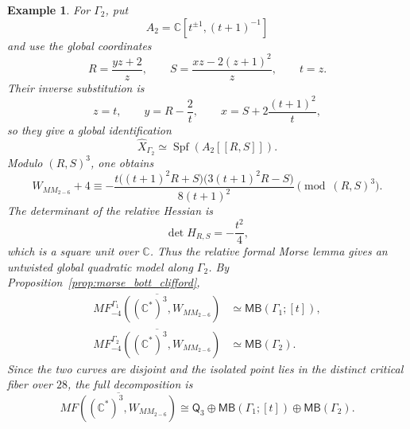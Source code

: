 \documentclass[11pt]{amsart}
\newtheorem{example}{Example}[section]
\newcommand{\MorseCat}[1]{\mathsf{Q}_{#1}}
\newcommand{\MBcat}[1]{\mathsf{MB}(#1)}
\newcommand{\MBtwcat}[2]{\mathsf{MB}(#1;[#2])}
\begin{document}
\begin{example}
For $\Gamma_2$, put
\[
A_2=\mathbb C[t^{\pm1},(t+1)^{-1}]
\]
and use the global coordinates
\[
R=\frac{yz+2}{z},
\qquad
S=\frac{xz-2(z+1)^2}{z},
\qquad
t=z.
\]
Their inverse substitution is
\[
z=t,
\qquad
y=R-\frac{2}{t},
\qquad
x=S+2\frac{(t+1)^2}{t},
\]
so they give a global identification
\[
\widehat X_{\Gamma_2}\simeq\operatorname{Spf}(A_2[[R,S]]).
\]
Modulo $(R,S)^3$, one obtains
\[
W_{MM_{2-6}}+4\equiv
-\frac{t\bigl((t+1)^2R+S\bigr)\bigl(3(t+1)^2R-S\bigr)}{8(t+1)^2}
\pmod{(R,S)^3}.
\]
The determinant of the relative Hessian is
\[
\det H_{R,S}=-\frac{t^2}{4},
\]
which is a square unit over $\mathbb C$. Thus the relative formal Morse lemma
gives an untwisted global quadratic model along $\Gamma_2$. By
Proposition~\ref{prop:morse_bott_clifford},
\[
\begin{aligned}
\overline{MF^{\Gamma_1}_{-4}((\mathbb C^*)^3,W_{MM_{2-6}})}
&\simeq \MBtwcat{\Gamma_1}{t},\\
\overline{MF^{\Gamma_2}_{-4}((\mathbb C^*)^3,W_{MM_{2-6}})}
&\simeq \MBcat{\Gamma_2}.
\end{aligned}
\]
Since the two curves are disjoint and the isolated point lies in the distinct
critical fiber over $28$, the full decomposition is
\[
\overline{MF((\mathbb{C}^*)^3,W_{MM_{2-6}})}
\cong
\MorseCat{3}\oplus \MBtwcat{\Gamma_1}{t}\oplus \MBcat{\Gamma_2}.
\]
\end{example}
\end{document}
